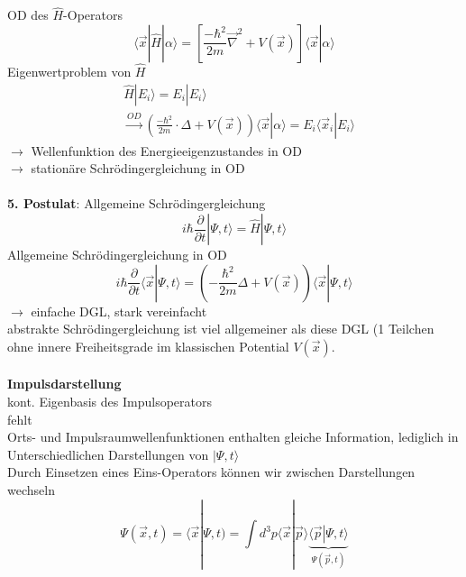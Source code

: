 \documentclass[10pt,article,colorback,accentcolor=tud9d]{scrartcl}
\begin{document}
OD des $\hat{H}$-Operators 
\begin{equation}
\langle\vec{x}\left.\right|\hat{H}\left.\right|\alpha\rangle=\left[\frac{-\hbar^2}{2m}\vec{\nabla}^2+V(\vec{x})\right]\langle\vec{x}\left.\right|\alpha\rangle
\label{eq:Hamiltonoperator Ortsdarstellung}
\end{equation}
Eigenwertproblem von $\hat{H}$
\begin{align}
&\hat{H}\left.\right|E_i\rangle=E_i\left.\right|E_i\rangle\nonumber\\
&\xrightarrow{OD}\left(\frac{-\hbar^2}{2m}\cdot \Delta+V(\vec{x})\right)\langle\vec{x}\left.\right|\alpha\rangle=E_i\langle\vec{x}_i\left.\right|E_i\rangle
\end{align}
$\rightarrow$ Wellenfunktion des Energieeigenzustandes in OD\\
$\rightarrow$ stationäre Schrödingergleichung in OD\\\\
\textbf{5. Postulat}: Allgemeine Schrödingergleichung
\begin{equation}
i\hbar\frac{\partial}{\partial t}\left.\right|\Psi,t\rangle=\hat{H}\left.\right|\Psi,t\rangle
\label{eq:Allgemeine Schrödingergleichung}
\end{equation}
Allgemeine Schrödingergleichung in OD
\begin{equation}
i\hbar\frac{\partial}{\partial t}\langle\vec{x}\left.\right|\Psi,t\rangle=\left(-\frac{\hbar^2}{2m} \Delta+V(\vec{x})\right)\langle\vec{x}\left.\right|\Psi,t\rangle
\label{eq:Allgemeine Schrödingergleichung in OD}
\end{equation}
$\rightarrow$ einfache DGL, stark vereinfacht\\
abstrakte Schrödingergleichung ist viel allgemeiner als diese DGL (1 Teilchen ohne innere Freiheitsgrade im klassischen Potential $V(\vec{x})$.\\\\
\textbf{Impulsdarstellung}\\
kont. Eigenbasis des Impulsoperators\\

\textcolor[rgb]{1,0,0}{fehlt}\\
Orts- und Impulsraumwellenfunktionen enthalten gleiche Information, lediglich in Unterschiedlichen Darstellungen von $\left.\right|\Psi,t\rangle$\\
Durch Einsetzen eines Eins-Operators können wir zwischen Darstellungen wechseln
\begin{equation}
\Psi(\vec{x},t)=\langle\vec{x}\left.\right|\Psi,t)=\int d^3p\langle\vec{x}\left.\right|\vec{p}\rangle\underbrace{\langle\vec{p}\left.\right|\Psi,t\rangle}_{\Psi(\vec{p},t)}
\end{equation}
\end{document}

